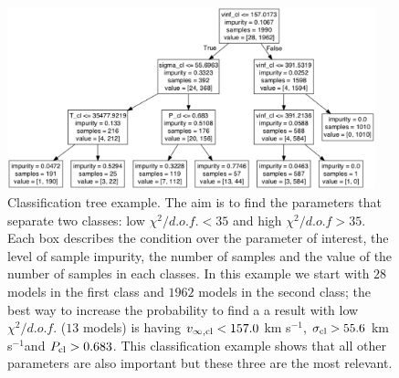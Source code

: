 \documentclass[a4,useAMS,usenatbib,usegraphicx]{mn2e}
\newcommand{\kms}{km s$^{-1}$}
\begin{document}
\begin{figure}
\begin{center}
\includegraphics[width=0.95\textwidth]{tree_result.pdf}
\caption{Classification tree example. 
The aim is to find the parameters that separate two
classes: low $\chi^2/d.o.f. < 35$ and high $\chi^2/d.o.f>35$. 
Each box describes the condition over the parameter of interest, the
level of sample impurity, the number of samples and the value of the
number of samples in each classes.  
In this example we start with $28$ models in the first class and
$1962$ models in the second class; the best way to increase the probability to find a
a result with low $\chi^2/d.o.f.$ ($13$ models) is having $v_{\infty,{\rm cl}}<157.0$ \kms,
$\sigma_{{\rm cl}}>55.6$ \kms and $P_{\rm cl}>0.683$.
This classification example shows that all other parameters are also
important but these three are the most relevant. 
\label{fig:tree}}
\end{center}
\end{figure}
\end{document}

